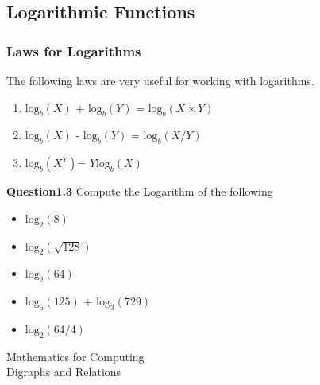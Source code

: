 \documentclass[a4paper,12pt]{article}
\begin{document}
\subsection{Logarithmic Functions}

\subsubsection{Laws for Logarithms}
The following laws are very useful for working with logarithms.
\begin{enumerate}
\item $\mbox{log}_b(X)$ + $\mbox{log}_b(Y)$ = $\mbox{log}_b(X\times Y)$
\item $\mbox{log}_b(X)$ - $\mbox{log}_b(Y)$ = $\mbox{log}_b(X / Y)$
\item $\mbox{log}_b(X^Y)$= $Y \mbox{log}_b(X)$
\end{enumerate}

\noindent \textbf{Question1.3} Compute the Logarithm of the following
\begin{itemize}
\item $\mbox{log}_2(8)$
\item $\mbox{log}_2(\sqrt{128})$
\item $\mbox{log}_2(64)$
\item $\mbox{log}_5(125)$ +   $\mbox{log}_3(729)$
\item $\mbox{log}_2(64/4)$
\end{itemize}
\newpage
\begin{center}
\huge{Mathematics for Computing}\\
\LARGE{Digraphs and Relations}
\end{center}



\end{document}
